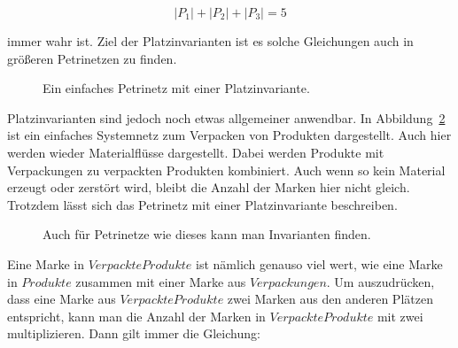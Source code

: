 		$$|P_1| + |P_2| + |P_3| = 5$$

		immer wahr ist.	Ziel der Platzinvarianten ist es solche Gleichungen auch in größeren Petrinetzen zu finden.

		\begin{figure}[h]
			\centering
			\caption{Ein einfaches Petrinetz mit einer Platzinvariante.}
			\label{fig:exinvariantsimple}
		\end{figure}
		
		Platzinvarianten sind jedoch noch etwas allgemeiner anwendbar. In Abbildung~\ref{fig:exinvariant} ist ein einfaches Systemnetz zum Verpacken von Produkten dargestellt. Auch hier werden wieder Materialflüsse dargestellt. Dabei werden Produkte mit Verpackungen zu verpackten Produkten kombiniert. Auch wenn so kein Material erzeugt oder zerstört wird, bleibt die Anzahl der Marken hier nicht gleich. Trotzdem lässt sich das Petrinetz mit einer Platzinvariante beschreiben.

		\begin{figure}[h]
			\centering
			\caption{Auch für Petrinetze wie dieses kann man Invarianten finden.}
			\label{fig:exinvariant}
		\end{figure}
		
		Eine Marke in $Verpackte Produkte$ ist nämlich genauso viel wert, wie eine Marke in $Produkte$ zusammen mit einer Marke aus $Verpackungen$. Um auszudrücken, dass eine Marke aus $Verpackte Produkte$ zwei Marken aus den anderen Plätzen entspricht, kann man die Anzahl der Marken in $Verpackte Produkte$ mit zwei multiplizieren. Dann gilt immer die Gleichung:

